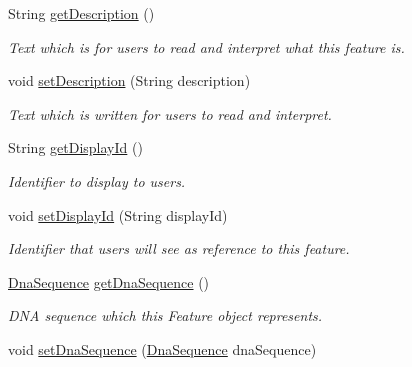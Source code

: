 \begin{DoxyCompactItemize}
\item 
String \hyperlink{classorg_1_1sbolstandard_1_1lib_s_b_o_lj_1_1_sequence_feature_ac7feffb7a33f63504ff1f87f19e2d2d8}{getDescription} ()
\begin{DoxyCompactList}\small\item\em Text which is for users to read and interpret what this feature is. \item\end{DoxyCompactList}\item 
void \hyperlink{classorg_1_1sbolstandard_1_1lib_s_b_o_lj_1_1_sequence_feature_a1d15d718177c4f5411ce6ab339889fd4}{setDescription} (String description)
\begin{DoxyCompactList}\small\item\em Text which is written for users to read and interpret. \item\end{DoxyCompactList}\item 
String \hyperlink{classorg_1_1sbolstandard_1_1lib_s_b_o_lj_1_1_sequence_feature_aefe76199cb4d0096f487b280c411d843}{getDisplayId} ()
\begin{DoxyCompactList}\small\item\em Identifier to display to users. \item\end{DoxyCompactList}\item 
void \hyperlink{classorg_1_1sbolstandard_1_1lib_s_b_o_lj_1_1_sequence_feature_a46b93a70e7bd612a7b429aac4829bc88}{setDisplayId} (String displayId)
\begin{DoxyCompactList}\small\item\em Identifier that users will see as reference to this feature. \item\end{DoxyCompactList}\item 
\hyperlink{classorg_1_1sbolstandard_1_1lib_s_b_o_lj_1_1_dna_sequence}{DnaSequence} \hyperlink{classorg_1_1sbolstandard_1_1lib_s_b_o_lj_1_1_sequence_feature_a596826001de0d3a682c2effa7fd6d50d}{getDnaSequence} ()
\begin{DoxyCompactList}\small\item\em DNA sequence which this Feature object represents. \item\end{DoxyCompactList}\item 
void \hyperlink{classorg_1_1sbolstandard_1_1lib_s_b_o_lj_1_1_sequence_feature_a2e16af0dece16378b9ee31d818bd8ef1}{setDnaSequence} (\hyperlink{classorg_1_1sbolstandard_1_1lib_s_b_o_lj_1_1_dna_sequence}{DnaSequence} dnaSequence)

\end{DoxyCompactItemize}
